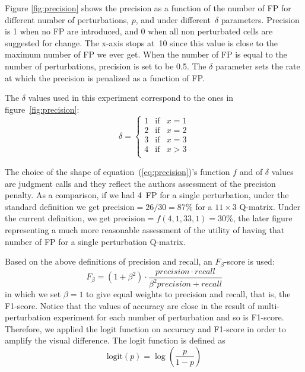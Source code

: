 \documentclass{edm_template}
\begin{document}
Figure \ref{fig:precision} shows the precision as a function of the number of FP for different number of perturbations, $p$, and under different~$\delta$ parameters.  Precision is 1 when no FP are introduced, and 0 when all non perturbated cells are suggested for change.  The x-axis stops at~10 since this value is close to the maximum number of FP we ever get.  When the number of FP is equal to the number of perturbations, precision is set to be 0.5. The $\delta$ parameter sets the rate at which the precision is penalized as a function of FP.

The $\delta$ values used in this experiment correspond to the ones in figure~\ref{fig:precision}:
\begin{equation*}
\delta = \left\lbrace 
\begin{array}{lll}
  1 & \mathrm{if} & x = 1\\
  2 & \mathrm{if} & x = 2\\
  3 & \mathrm{if} & x = 3\\
  4 & \mathrm{if} & x > 3\\
\end{array}
\right.
\end{equation*}

The choice of the shape of equation~(\ref{eq:precision})'s function $f$ and of $\delta$ values are judgment calls and they reflect the authors assessment of the precision penalty.  As a comparison, if we had 4~FP for a single perturbation, under the standard definition we get $\mathrm{precision}=26/30=87\%$ for a $11 \times 3$ Q-matrix. Under the current definition, we get $\mathrm{precision}=f(4,1,33,1)=30\%$, the later figure representing a much more reasonable assessment of the utility of having that number of FP for a single perturbation Q-matrix.

Based on the above definitions of precision and recall, an $F_\beta$-score is used:
$$ F_\beta=(1+\beta^2)\cdot \frac{precision \cdot recall}{\beta^2precision + recall}$$
in which we set $\beta=1$ to give equal weights to precision and recall, that is, the F1-score. Notice that the values of accuracy are close in the result of multi-perturbation experiment for each number of perturbation and so is F1-score. Therefore, we applied the logit function on accuracy and F1-score in order to amplify the visual difference. The logit function is defined as
$$ \mathrm{logit}(p)=\log\left(\frac{p}{1-p}\right) $$
\end{document}
